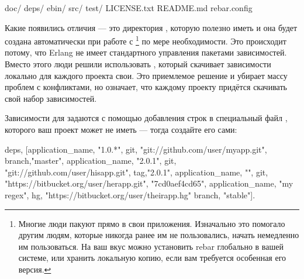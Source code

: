 \begin{VerbatimText}
doc/
deps/
ebin/
src/
test/
LICENSE.txt
README.md
rebar.config
\end{VerbatimText}

Какие появились отличия --- это директория , которую полезно иметь и она будет создана автоматически при работе с \footnote{Многие люди пакуют  прямо в свои приложения. Изначально это помогало другим людям, которые никогда ранее им не пользовались, начать немедленно им пользоваться. На ваш вкус можно установить rebar глобально в вашей системе, или хранить локальную копию, если вам требуется особенная его версия.} по мере необходимости. Это происходит потому, что Erlang не имеет стандартного управления пакетами зависимостей. Вместо этого люди решили использовать , который скачивает зависимости локально для каждого проекта свои. Это приемлемое решение и убирает массу проблем с конфликтами, но означает, что каждому проекту придётся скачивать свой набор зависимостей.

Зависимости для  задаются с помощью добавления строк в специальный файл , которого ваш проект может не иметь --- тогда создайте его сами:

\begin{VerbatimText}
{deps,
 [{application_name, "1.0.*",
   {git, "git://github.com/user/myapp.git", {branch,"master"}}},
  {application_name, "2.0.1",
   {git, "git://github.com/user/hisapp.git", {tag,"2.0.1"}}},
  {application_name, "", 
   {git, "https://bitbucket.org/user/herapp.git",  "7cd0aef4cd65"}},
  {application_name, "my regex",
   {hg, "https://bitbucket.org/user/theirapp.hg" {branch, "stable"}}}]}.
\end{VerbatimText}

